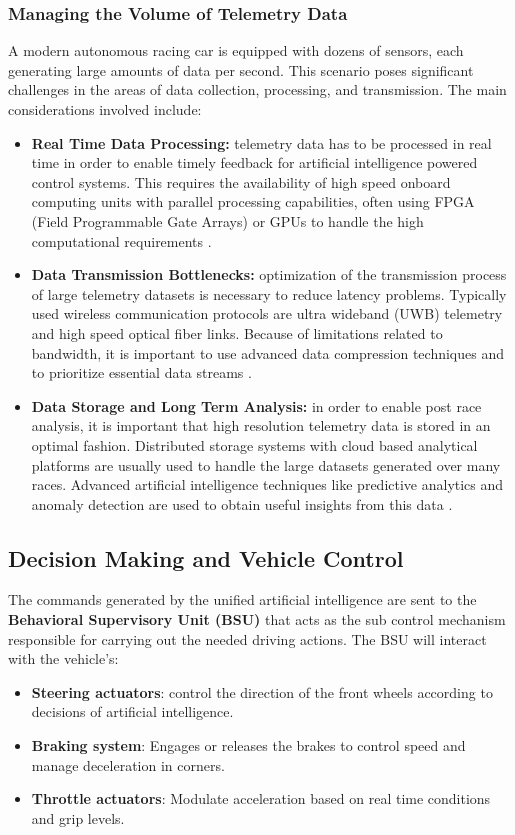 \documentclass[a4paper,final,12pt]{report}
\begin{document}
\subsubsection{Managing the Volume of Telemetry Data}
A modern autonomous racing car is equipped with dozens of sensors, each generating large amounts of data per second. This scenario poses significant challenges in the areas of data collection, processing, and transmission. The main considerations involved include: 
\begin{itemize}
    \item \textbf{Real Time Data Processing: }telemetry data has to be processed in real time in order to enable timely feedback for artificial intelligence powered control systems. This requires the availability of high speed onboard computing units with parallel processing capabilities, often using FPGA (Field Programmable Gate Arrays) or GPUs to handle the high computational requirements \cite{real_time_processing}.
    \item \textbf{Data Transmission Bottlenecks: }optimization of the transmission process of large telemetry datasets is necessary to reduce latency problems. Typically used wireless communication protocols are ultra wideband (UWB) telemetry and high speed optical fiber links. Because of limitations related to bandwidth, it is important to use advanced data compression techniques and to prioritize essential data streams \cite{data_transmission}.
    \item \textbf{Data Storage and Long Term Analysis: }in order to enable post race analysis, it is important that high resolution telemetry data is stored in an optimal fashion. Distributed storage systems with cloud based analytical platforms are usually used to handle the large datasets generated over many races. Advanced artificial intelligence techniques like predictive analytics and anomaly detection are used to obtain useful insights from this data \cite{data_storage}.
\end{itemize}

\subsection{Decision Making and Vehicle Control}
The commands generated by the unified artificial intelligence are sent to the \textbf{Behavioral Supervisory Unit (BSU)} that acts as the sub control mechanism responsible for carrying out the needed driving actions. The BSU will interact with the vehicle’s:
\begin{itemize}
    \item \textbf{Steering actuators}: control the direction of the front wheels according to decisions of artificial intelligence.
    \item \textbf{Braking system}: Engages or releases the brakes to control speed and manage deceleration in corners.
    \item \textbf{Throttle actuators}: Modulate acceleration based on real time conditions and grip levels.
\end{itemize}
\end{document}
